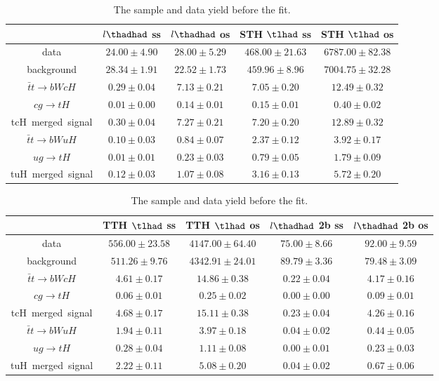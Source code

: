 \begin{table}
\caption{The sample and data yield before the fit.}
\centering
\begin{tabular}{|c|c|c|c|c|} \hline
 & $l\thadhad$ ss & $l\thadhad$ os & STH $\tlhad$ ss & STH $\tlhad$ os\\\hline
data & $24.00\pm4.90$ & $28.00\pm5.29$ & $468.00\pm21.63$ & $6787.00\pm82.38$\\\hline
background & $28.34\pm1.91$ & $22.52\pm1.73$ & $459.96\pm8.96$ & $7004.75\pm32.28$\\\hline
$\bar{t}t\to bWcH$ & $0.29\pm0.04$ & $7.13\pm0.21$ & $7.05\pm0.20$ & $12.49\pm0.32$\\\hline
$cg\to tH$ & $0.01\pm0.00$ & $0.14\pm0.01$ & $0.15\pm0.01$ & $0.40\pm0.02$\\\hline
tcH~merged~signal & $0.30\pm0.04$ & $7.27\pm0.21$ & $7.20\pm0.20$ & $12.89\pm0.32$\\\hline
$\bar{t}t\to bWuH$ & $0.10\pm0.03$ & $0.84\pm0.07$ & $2.37\pm0.12$ & $3.92\pm0.17$\\\hline
$ug\to tH$ & $0.01\pm0.01$ & $0.23\pm0.03$ & $0.79\pm0.05$ & $1.79\pm0.09$\\\hline
tuH~merged~signal & $0.12\pm0.03$ & $1.07\pm0.08$ & $3.16\pm0.13$ & $5.72\pm0.20$\\\hline
\end{tabular}
\begin{tabular}{|c|c|c|c|c|} \hline
 & TTH $\tlhad$ ss & TTH $\tlhad$ os & $l\thadhad$ 2b ss & $l\thadhad$ 2b os\\\hline
data & $556.00\pm23.58$ & $4147.00\pm64.40$ & $75.00\pm8.66$ & $92.00\pm9.59$\\\hline
background & $511.26\pm9.76$ & $4342.91\pm24.01$ & $89.79\pm3.36$ & $79.48\pm3.09$\\\hline
$\bar{t}t\to bWcH$ & $4.61\pm0.17$ & $14.86\pm0.38$ & $0.22\pm0.04$ & $4.17\pm0.16$\\\hline
$cg\to tH$ & $0.06\pm0.01$ & $0.25\pm0.02$ & $0.00\pm0.00$ & $0.09\pm0.01$\\\hline
tcH~merged~signal & $4.68\pm0.17$ & $15.11\pm0.38$ & $0.23\pm0.04$ & $4.26\pm0.16$\\\hline
$\bar{t}t\to bWuH$ & $1.94\pm0.11$ & $3.97\pm0.18$ & $0.04\pm0.02$ & $0.44\pm0.05$\\\hline
$ug\to tH$ & $0.28\pm0.04$ & $1.11\pm0.08$ & $0.00\pm0.01$ & $0.23\pm0.03$\\\hline
tuH~merged~signal & $2.22\pm0.11$ & $5.08\pm0.20$ & $0.04\pm0.02$ & $0.67\pm0.06$\\\hline

\end{tabular}
\end{table}
